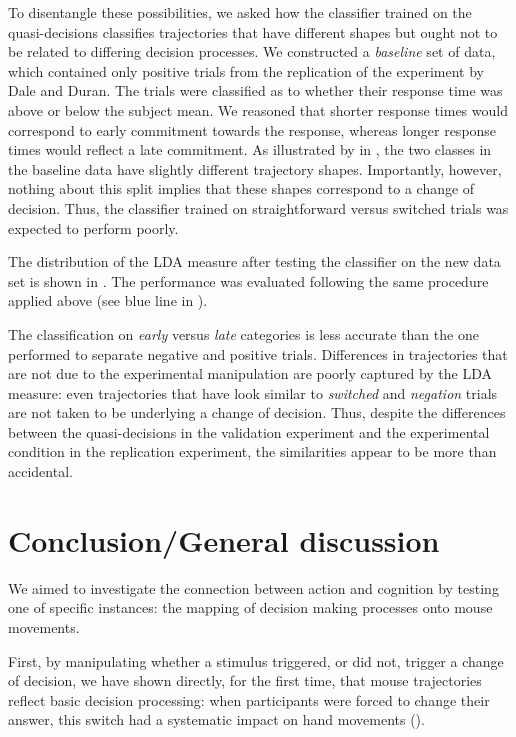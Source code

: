 \documentclass{article}
\begin{document}
To disentangle these possibilities, we asked how the classifier trained on the quasi-decisions classifies trajectories that have different shapes but ought not to be related to differing decision processes.
We  constructed a \emph{baseline} set of data, which contained only positive trials from the replication of the experiment by Dale and Duran. The trials were classified as to whether their response time was above or below the subject mean. We reasoned that shorter response times would correspond to early commitment towards the response, whereas longer response times would reflect a late commitment. As illustrated by in , the two classes in the baseline data have slightly different trajectory shapes. Importantly, however, nothing about this split implies that these shapes correspond to a change of decision. Thus, the classifier trained on straightforward versus switched trials was expected to perform poorly.

The distribution of the LDA measure after testing the classifier on the new data set is shown in . The performance was evaluated following the same procedure applied above (see blue line in ). 

The classification on \emph{early} versus \emph{late} categories is less accurate than the one performed to separate negative and positive trials.
Differences in trajectories that are not due to the experimental manipulation are poorly captured by the LDA measure: even trajectories that  have look similar to \emph{switched} and \emph{negation} trials are not taken to be underlying a change of decision. 
Thus, despite the differences between the quasi-decisions in the validation experiment and the experimental condition in the replication experiment, the similarities appear to be more than accidental.

\section{Conclusion/General discussion}

We aimed to investigate the connection between action and cognition by testing one of  specific instances: the mapping of decision making processes onto mouse movements.

First, by manipulating whether a stimulus triggered, or did not, trigger a change of decision, we have shown directly, for the first time, that mouse trajectories reflect basic decision processing: when participants were forced to change their answer, this switch had a systematic impact on hand movements (). 
\end{document}
